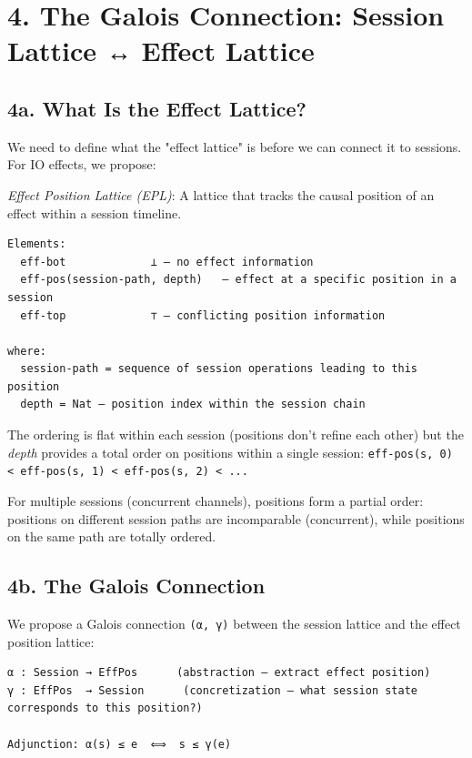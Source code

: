 \documentclass[11pt]{article}
\begin{document}
\section{4. The Galois Connection: Session Lattice ↔ Effect Lattice}
\label{sec:org58fa323}

\subsection{4a. What Is the Effect Lattice?}
\label{sec:org1816eea}

We need to define what the "effect lattice" is before we can connect it to
sessions. For IO effects, we propose:

\emph{Effect Position Lattice (EPL)}: A lattice that tracks the causal position of
an effect within a session timeline.

\begin{verbatim}
Elements:
  eff-bot             ⊥ — no effect information
  eff-pos(session-path, depth)   — effect at a specific position in a session
  eff-top             ⊤ — conflicting position information

where:
  session-path = sequence of session operations leading to this position
  depth = Nat — position index within the session chain
\end{verbatim}

The ordering is flat within each session (positions don't refine each other)
but the \emph{depth} provides a total order on positions within a single session:
\texttt{eff-pos(s, 0) < eff-pos(s, 1) < eff-pos(s, 2) < ...}

For multiple sessions (concurrent channels), positions form a partial order:
positions on different session paths are incomparable (concurrent), while
positions on the same path are totally ordered.
\subsection{4b. The Galois Connection}
\label{sec:orgd11fc01}

We propose a Galois connection \texttt{(α, γ)} between the session lattice and the
effect position lattice:

\begin{verbatim}
α : Session → EffPos      (abstraction — extract effect position)
γ : EffPos  → Session      (concretization — what session state corresponds to this position?)

Adjunction: α(s) ≤ e  ⟺  s ≤ γ(e)
\end{verbatim}
\end{document}
